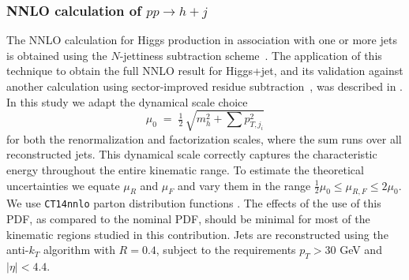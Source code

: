 \subsubsection{NNLO calculation of $pp\to h+j$}
\label{sec:hjetscomp:tools:fo:BFGLP}

The NNLO calculation for Higgs production in association with one or 
more jets is obtained using the $N$-jettiness subtraction 
scheme~\cite{Boughezal:2015dva,Gaunt:2015pea}.  The application of 
this technique to obtain the full NNLO result for Higgs+jet, and its 
validation against another calculation using sector-improved residue 
subtraction~\cite{Boughezal:2015dra}, was described in 
\cite{Boughezal:2015aha}.  In this study we adapt the dynamical scale choice
%
\begin{equation}\label{eq:bfglpScale}
  \mu_0\;=\;\tfrac{1}{2}\,\sqrt{m_{h}^2+\sum p_{T,j_i}^2}
\end{equation}
%
for both the renormalization and factorization scales, where the sum 
runs over all reconstructed jets.  This dynamical scale correctly 
captures the characteristic energy throughout the entire kinematic 
range.  To estimate the theoretical uncertainties we equate $\mu_R$ 
and $\mu_F$ and vary them in the range $\tfrac{1}{2}\mu_0 \leq \mu_{R,F} \leq 2 \mu_0$.  
We use \texttt{CT14nnlo} parton distribution functions 
\cite{Dulat:2015mca}. The effects of the use of this PDF, as compared to the nominal PDF, should be 
minimal for most of the kinematic regions studied in this contribution. Jets are reconstructed using the anti-$k_T$ algorithm 
with $R=0.4$, subject to the requirements $p_T>30$ GeV and $|\eta|<4.4$.
